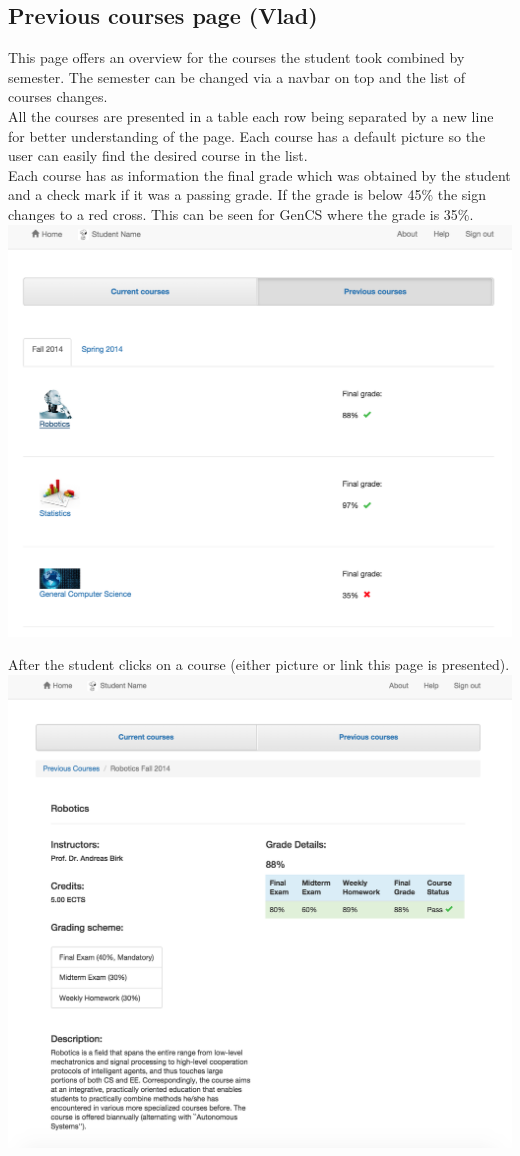 \subsection{Previous courses page (Vlad)}

This page offers an overview for the courses the student took combined by semester. The semester can be changed via a navbar on top and the list of courses changes.\\
All the courses are presented in a table each row being separated by a new line for better understanding of the page. Each course has a default picture so the user can easily find the desired course in the list. \\
Each course has as information the final grade which was obtained by the student and a check mark if it was a passing grade. If the grade is below 45\% the sign changes to a red cross. This can be seen for GenCS where the grade is 35\%.\\
\includegraphics[width=.85\textwidth]{screenshots/PrevoiusCoursesOverview.png}

After the student clicks on a course (either picture or link this page is presented).\\

\includegraphics[width=.85\textwidth]{screenshots/PreviousCourseDetail.png}


